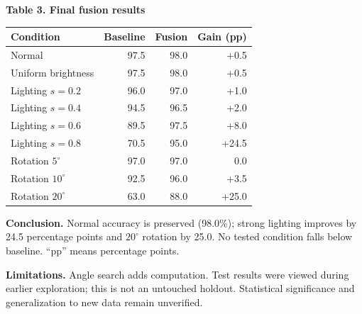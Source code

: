\documentclass[10pt,a4paper]{article}
\begin{document}
\begin{minipage}{\linewidth}
\centering
\textbf{Table 3. Final fusion results}\par\vspace{2pt}
{\fontsize{9}{10.5}\selectfont
\begin{tabular}{@{}lrrr@{}}
\toprule
Condition & Baseline & Fusion & Gain (pp)\\
\midrule
Normal & 97.5 & 98.0 & +0.5\\
Uniform brightness & 97.5 & 98.0 & +0.5\\
Lighting $s=0.2$ & 96.0 & 97.0 & +1.0\\
Lighting $s=0.4$ & 94.5 & 96.5 & +2.0\\
Lighting $s=0.6$ & 89.5 & 97.5 & +8.0\\
Lighting $s=0.8$ & 70.5 & 95.0 & +24.5\\
Rotation $5^\circ$ & 97.0 & 97.0 & 0.0\\
Rotation $10^\circ$ & 92.5 & 96.0 & +3.5\\
Rotation $20^\circ$ & 63.0 & 88.0 & +25.0\\
\bottomrule
\end{tabular}}
\end{minipage}
\par\vspace{3pt}
\textbf{Conclusion.} Normal accuracy is preserved (98.0\%); strong lighting improves by 24.5 percentage points and $20^\circ$ rotation by 25.0. No tested condition falls below baseline. ``pp'' means percentage points.

\textbf{Limitations.} Angle search adds computation. Test results were viewed during earlier exploration; this is not an untouched holdout. Statistical significance and generalization to new data remain unverified.
\end{document}
